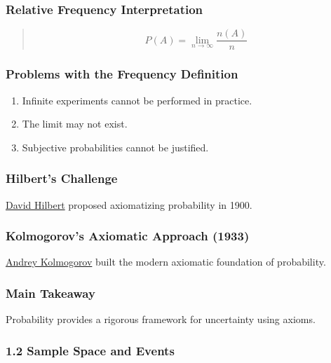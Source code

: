 \documentclass[11pt]{article}
\begin{document}
\subsubsection{Relative Frequency Interpretation}
\label{sec:orge4fea1b}

\begin{quote}
\[
P(A)=
\lim_{n\to\infty}
\frac{n(A)}{n}
\]
\end{quote}
\subsubsection{Problems with the Frequency Definition}
\label{sec:org609c733}

\begin{enumerate}
\item Infinite experiments cannot be performed in practice.
\item The limit may not exist.
\item Subjective probabilities cannot be justified.
\end{enumerate}
\subsubsection{Hilbert's Challenge}
\label{sec:orgee98e36}

\href{../../_ocean_/people.org}{David Hilbert} proposed axiomatizing probability in 1900.
\subsubsection{Kolmogorov's Axiomatic Approach (1933)}
\label{sec:org8118f60}

\href{../../_ocean_/people.org}{Andrey Kolmogorov} built the modern axiomatic foundation of probability.
\subsubsection{Main Takeaway}
\label{sec:org79107fc}

Probability provides a rigorous framework for uncertainty using axioms.
\subsubsection{1.2 Sample Space and Events}
\label{sec:orga51b07c}
\end{document}
